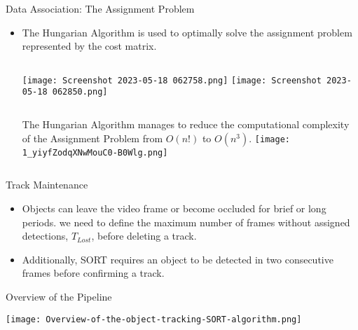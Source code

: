\documentclass{beamer}
\begin{document}
\begin{frame}[t]{Data Association: The Assignment Problem}
\begin{itemize}
\item The Hungarian Algorithm is used to optimally solve the assignment problem represented by the cost matrix.
\begin{columns}[onlytextwidth]
\texttt{[image: Screenshot 2023-05-18 062758.png]}
\texttt{[image: Screenshot 2023-05-18 062850.png]}
\end{columns}


\begin{columns}[onlytextwidth]
The Hungarian Algorithm manages to reduce the computational complexity of the Assignment Problem from $O(n!)$ to $O(n^3)$.
\texttt{[image: 1\_yiyfZodqXNwMouC0-B0Wlg.png]}
\end{columns}

\end{itemize}
\end{frame}

\begin{frame}{Track Maintenance}
\begin{itemize}
\item Objects can leave the video frame or become occluded for brief or long periods. we need to define the maximum number of frames without assigned detections, $T_{Lost}$, before deleting a track.
	
\item Additionally, SORT requires an object to be detected in two consecutive frames before confirming a track.
\end{itemize}
\end{frame}

\begin{frame}{Overview of the Pipeline}
\begin{center}
\texttt{[image: Overview-of-the-object-tracking-SORT-algorithm.png]}
\end{center}
\end{frame}
\end{document}
